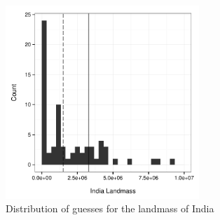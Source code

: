 \documentclass{article}
\begin{document}
\begin{figure}
\begin{center}
\includegraphics[width=0.65\textwidth]{../../output/inClass_exp/india.pdf}
\caption{Distribution of guesses for the landmass of India}
\label{pareto}
\end{center}	
\end{figure}
\end{document}
